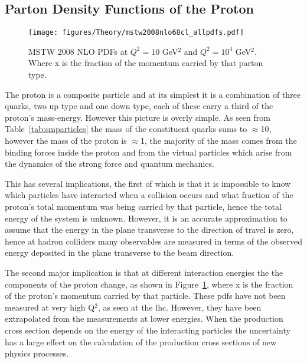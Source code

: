 \subsection{Parton Density Functions of the Proton} %
\label{sub:parton_density_functions_of_the_proton}

\begin{figure}[htbp]
  \centering
    \texttt{[image: figures/Theory/mstw2008nlo68cl\_allpdfs.pdf]}
  \caption{MSTW 2008 NLO PDFs at $Q^{2} = 10$ GeV$^{2}$ and $Q^{2} = 10^{4}$ GeV$^{2}$\cite{MSTW}. Where x is the fraction of the momentum carried by that parton type.}
  \label{fig:mstwpdfs}
\end{figure}

The proton is a composite particle and at its simplest it is a combination of 
three quarks, two up type and one down type, each of these carry a third of the 
proton's mass-energy. However this picture is overly simple. As seen from 
Table~\ref{tab:smparticles} the mass of the constituent quarks sums to 
$\approx$\unit{10}{\MeV}, however the mass of the proton is 
$\approx$\unit{1}{\GeV}, the majority of the mass comes from the binding forces 
inside the proton and from the virtual particles which arise from the dynamics 
of the strong force and quantum mechanics.

This has several implications, the first of which is that it is impossible to 
know which particles have interacted when a collision occurs and what fraction 
of the proton's total momentum was being carried by that particle, hence the 
total energy of the system is unknown. However, it is an accurate approximation 
to assume that the energy in the plane transverse to the direction of travel is 
zero, hence at hadron colliders many observables are measured in terms of the 
observed energy deposited in the plane transverse to the beam direction.


The second major implication is that at different interaction energies the the 
components of the proton change, as shown in Figure~\ref{fig:mstwpdfs}, where x 
is the fraction of the proton's momentum carried by that particle. These 
\ac{pdf}s have not been measured at very high Q$^{2}$, as seen at the 
\ac{lhc}. However, they have been extrapolated from the measurements at lower 
energies. When the production cross section depends on the energy of the 
interacting particles the uncertainty has a large effect on the calculation of 
the production cross sections of new physics processes.






